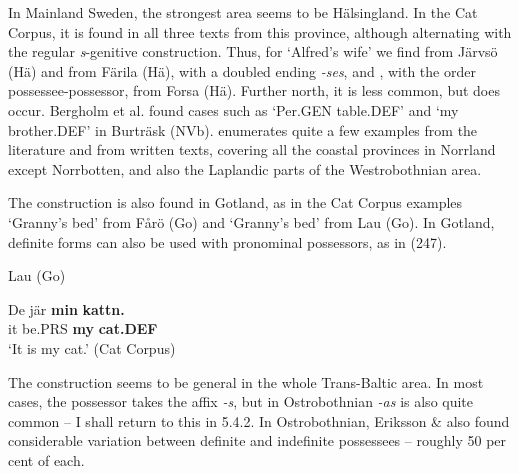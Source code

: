 In Mainland Sweden, the strongest area seems to be Hälsingland. In the Cat Corpus, it is found in all three texts from this province, although alternating with the regular \textit{s}{}-genitive construction. Thus, for ‘Alfred’s wife’ we find  from Järvsö (Hä) and  from Färila (Hä), with a doubled ending\textit{ {}-ses}, and , with the order possessee-possessor, from Forsa (Hä). Further north, it is less common, but does occur.  Bergholm et al. found cases such as ‘Per.GEN table.DEF’ and  ‘my brother.DEF’ in Burträsk (NVb). \citet[27]{Delsing2003a} enumerates quite a few examples from the literature and from written texts, covering all the coastal provinces in Norrland except Norrbotten, and also the Laplandic parts of the Westrobothnian area. 


The construction is also found in Gotland, as in the Cat Corpus examples  ‘Granny’s bed’ from Fårö (Go) and ‘Granny’s bed’ from Lau (Go). In Gotland, definite forms can also be used with pronominal possessors, as in (247).


\item 

\label{bkm:Ref155247297}Lau (Go)



 \ea\label{}
\gll De  jär  \textbf{min} \textbf{kattn.}\\


it  be.PRS  \textbf{my} \textbf{cat.DEF}\\

\glt  ‘It is my cat.’ (Cat Corpus)

\z

The construction seems to be general in the whole Trans-Baltic area. In most cases, the possessor takes the affix\textit{ {}-s}, but in Ostrobothnian\textit{ {}-as }is also quite common – I shall return to this in 5.4.2. In Ostrobothnian, Eriksson \& \citet{Rendahl1999} also found considerable variation between definite and indefinite possessees – roughly 50 per cent of each. 

